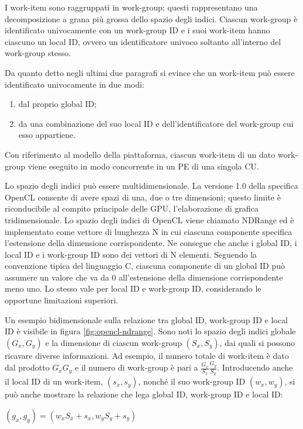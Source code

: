 \documentclass[12pt,a4paper,oneside]{book}
\begin{document}
I work-item sono raggruppati in work-group; questi rappresentano una decomposizione a grana più grossa dello spazio degli indici. Ciascun work-group è identificato univocamente con un work-group ID e i suoi work-item hanno ciascuno un local ID, ovvero un identificatore univoco soltanto all'interno del work-group stesso.

Da quanto detto negli ultimi due paragrafi si evince che un work-item può essere identificato univocamente in due modi:
\begin{enumerate}
\item dal proprio global ID;
\item da una combinazione del suo local ID e dell'identificatore del work-group cui esso appartiene.
\end{enumerate}

Con riferimento al modello della piattaforma, ciascun work-item di un dato work-group viene eseguito in modo concorrente in un \ac{PE} di una singola \ac{CU}.

Lo spazio degli indici può essere multidimensionale. La versione 1.0 della specifica \ac{OpenCL} consente di avere spazi di una, due o tre dimensioni\cite{bib:opencl}; questo limite è riconducibile al compito principale delle \ac{GPU}, l'elaborazione di grafica tridimensionale. Lo spazio degli indici di \ac{OpenCL} viene chiamato \ac{NDRange} ed è implementato come vettore di lunghezza N in cui ciascuna componente specifica l'estensione della dimensione corrispondente. Ne consegue che anche i global ID, i local ID e i work-group ID sono dei vettori di N elementi. Seguendo la convenzione tipica del linguaggio C, ciascuna componente di un global ID può assumere un valore che va da 0 all'estensione della dimensione corrispondente meno uno. Lo stesso vale per local ID e work-group ID, considerando le opportune limitazioni superiori. 

Un esempio bidimensionale sulla relazione tra global ID, work-group ID e local ID è visibile in figura \ref{fig:opencl-ndrange}. Sono noti lo spazio degli indici globale $(G_x, G_y)$ e la dimensione di ciascun work-group $(S_x, S_y)$, dai quali si possono ricavare diverse informazioni. Ad esempio, il numero totale di work-item è dato dal prodotto $G_xG_y$ e il numero di work-group è pari a $\frac{G_x}{S_x}\frac{G_y}{S_y}$. Introducendo anche il local ID di un work-item, $(s_x, s_y)$, nonché il suo work-group ID $(w_x, w_y)$, si può anche mostrare la relazione che lega global ID, work-group ID e local ID:

\begin{center}
\begin{math}
(g_x, g_y) = (w_xS_x + s_x, w_yS_y + s_y)
\end{math}
\end{center}
\end{document}
